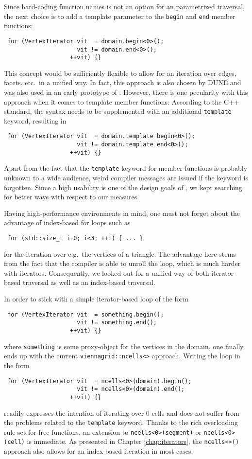  Since hard-coding function names is not an option for an parametrized traversal,
 the next choice is to add a template parameter to the \lstinline|begin| and \lstinline|end| member functions:
 \begin{lstlisting}
 for (VertexIterator vit  = domain.begin<0>();
                     vit != domain.end<0>();
                   ++vit) {}
 \end{lstlisting}
 This concept would be sufficiently flexible to allow for an iteration over edges, facets, etc.~in a unified way.
 In fact, this approach is also chosen by DUNE \cite{DUNE} and was also used in an early prototype of {\ViennaGrid}.
 However, there is one pecularity with this approach when it comes to template member functions: According to the C++ standard, the syntax needs to be supplemented with an additional \lstinline|template| keyword, resulting in
 \begin{lstlisting}
 for (VertexIterator vit  = domain.template begin<0>();
                     vit != domain.template end<0>();
                   ++vit) {}
 \end{lstlisting}
 Apart from the fact that the \lstinline|template| keyword for member functions is probably unknown to a wide audience, 
 weird compiler messages are issued if the keyword is forgotten. Since a high usability is one of the design goals of {\ViennaGrid},
 we kept searching for better ways with respect to our measures.

 Having high-performance environments in mind, one must not forget about the advantage of index-based for loops such as 
 \begin{lstlisting}
 for (std::size_t i=0; i<3; ++i) { ... }
 \end{lstlisting}
 for the iteration over e.g.~the vertices of a triangle.
 The advantage here stems from the fact that the compiler is able to unroll the loop, which is much harder with iterators.
 Consequently, we looked out for a unified way of both iterator-based traversal as well as an index-based traversal.

 In order to stick with a simple iterator-based loop of the form
 \begin{lstlisting}
 for (VertexIterator vit  = something.begin();
                     vit != something.end();
                   ++vit) {}
 \end{lstlisting}
 where \lstinline|something| is some proxy-object for the vertices in the domain, one finally ends up with the current \lstinline|viennagrid::ncells<>| approach.
 Writing the loop in the form
 \begin{lstlisting}
 for (VertexIterator vit  = ncells<0>(domain).begin();
                     vit != ncells<0>(domain).end();
                   ++vit) {}
 \end{lstlisting}
 readily expresses the intention of iterating over $0$-cells and does not suffer from the problems related to the \lstinline|template| keyword.
 Thanks to the rich overloading rule-set for free functions, an extension to \lstinline|ncells<0>(segment)| or \lstinline|ncells<0>(cell)| is immediate.
 As presented in Chapter \ref{chap:iterators}, the \lstinline|ncells<>()| approach also allows for an index-based iteration in most cases.
 
